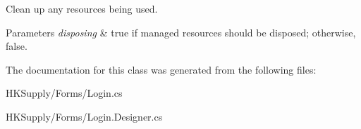 Clean up any resources being used. 


\begin{DoxyParams}{Parameters}
{\em disposing} & true if managed resources should be disposed; otherwise, false.\\
\hline
\end{DoxyParams}


The documentation for this class was generated from the following files\+:\begin{DoxyCompactItemize}
\item 
H\+K\+Supply/\+Forms/Login.\+cs\item 
H\+K\+Supply/\+Forms/Login.\+Designer.\+cs\end{DoxyCompactItemize}

